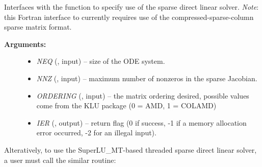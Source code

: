 \documentclass[letterpaper,10pt,english]{sphinxmanual}
\begin{document}
\begin{fulllineitems}
\label{f_interface/Usage:f/_/FARKKLU}
Interfaces with the {\hyperref[c_interface/User_callable:c.ARKKLU]{\emph{}}} function to
specify use of the sparse direct linear solver.  \emph{Note}: this
Fortran interface to {\hyperref[c_interface/User_callable:c.ARKKLU]{\emph{}}} currently requires use of
the compressed-sparse-column sparse matrix format.
\begin{description}
\item[{\textbf{Arguments:}}] \leavevmode\begin{itemize}
\item {} 
\emph{NEQ} (, input) -- size of the ODE system.

\item {} 
\emph{NNZ} (, input) -- maximum number of nonzeros in
the sparse Jacobian.

\item {} 
\emph{ORDERING} (, input) -- the matrix ordering desired,
possible values come from the KLU package (0 = AMD, 1 = COLAMD)

\item {} 
\emph{IER} (, output) -- return flag (0 if success, -1 if a
memory allocation error occurred, -2 for an illegal input).

\end{itemize}

\end{description}

\end{fulllineitems}


Alteratively, to use the SuperLU\_MT-based threaded sparse direct
linear solver, a user must call the similar {\hyperref[f_interface/Usage:f/_/FARKSUPERLUMT]{\emph{}}}
routine:
\end{document}
